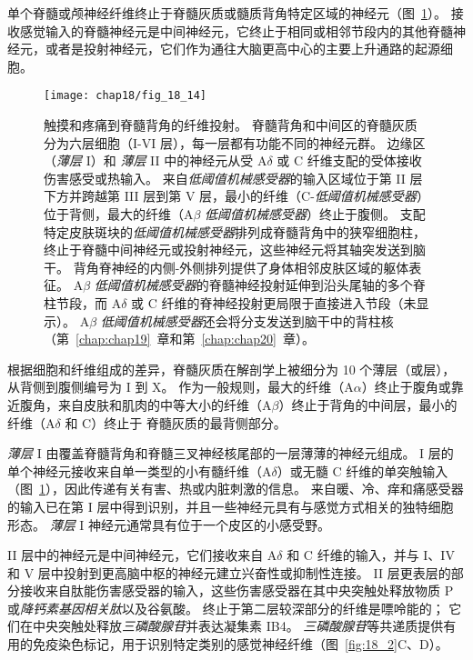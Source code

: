 单个脊髓或颅神经纤维终止于脊髓灰质或髓质背角特定区域的神经元（图~\ref{fig:18_14}）。
接收感觉输入的脊髓神经元是中间神经元，它终止于相同或相邻节段内的其他脊髓神经元，或者是投射神经元，它们作为通往大脑更高中心的主要上升通路的起源细胞。


\begin{figure}[htbp]
	\centering
	\texttt{[image: chap18/fig\_18\_14]}
	\caption{触摸和疼痛到脊髓背角的纤维投射。
		脊髓背角和中间区的脊髓灰质分为六层细胞（I-VI 层），每一层都有功能不同的神经元群。
		边缘区（\textit{薄层} I）和 \textit{薄层} II 中的神经元从受 A$\delta$ 或 C 纤维支配的受体接收伤害感受或热输入。 
		来自\textit{低阈值机械感受器}的输入区域位于第 II 层下方并跨越第 III 层到第 V 层，最小的纤维（C-\textit{低阈值机械感受器}）位于背侧，最大的纤维（A$\beta$ \textit{低阈值机械感受器}）终止于腹侧。
		支配特定皮肤斑块的\textit{低阈值机械感受器}排列成脊髓背角中的狭窄细胞柱，终止于脊髓中间神经元或投射神经元，这些神经元将其轴突发送到脑干。
		背角脊神经的内侧-外侧排列提供了身体相邻皮肤区域的躯体表征。
		A$\beta$ \textit{低阈值机械感受器}的脊髓神经投射延伸到沿头尾轴的多个脊柱节段，而 A$\delta$ 或 C 纤维的脊神经投射更局限于直接进入节段（未显示）。
		A$\beta$ \textit{低阈值机械感受器}还会将分支发送到脑干中的背柱核（第~\ref{chap:chap19}~章和第~\ref{chap:chap20}~章）。}
	\label{fig:18_14}
\end{figure}


根据细胞和纤维组成的差异，脊髓灰质在解剖学上被细分为 10 个薄层（或层），从背侧到腹侧编号为 I 到 X。
作为一般规则，最大的纤维（A$\alpha$）终止于腹角或靠近腹角，来自皮肤和肌肉的中等大小的纤维（A$\beta$）终止于背角的中间层，最小的纤维（A$\delta$ 和 C）终止于 脊髓灰质的最背侧部分。


\textit{薄层} I 由覆盖脊髓背角和脊髓三叉神经核尾部的一层薄薄的神经元组成。
I 层的单个神经元接收来自单一类型的小有髓纤维（A$\delta$）或无髓 C 纤维的单突触输入（图~\ref{fig:18_14}），因此传递有关有害、热或内脏刺激的信息。
来自暖、冷、痒和痛感受器的输入已在第 I 层中得到识别，并且一些神经元具有与感觉方式相关的独特细胞形态。
\textit{薄层} I 神经元通常具有位于一个皮区的小感受野。


II 层中的神经元是中间神经元，它们接收来自 A$\delta$ 和 C 纤维的输入，并与 I、IV 和 V 层中投射到更高脑中枢的神经元建立兴奋性或抑制性连接。
II 层更表层的部分接收来自肽能伤害感受器的输入，这些伤害感受器在其中央突触处释放物质 P 或\textit{降钙素基因相关肽}以及谷氨酸。
终止于第二层较深部分的纤维是嘌呤能的；
它们在中央突触处释放\textit{三磷酸腺苷}并表达凝集素 IB4。
\textit{三磷酸腺苷}等共递质提供有用的免疫染色标记，用于识别特定类别的感觉神经纤维（图~\ref{fig:18_2}C、D）。


